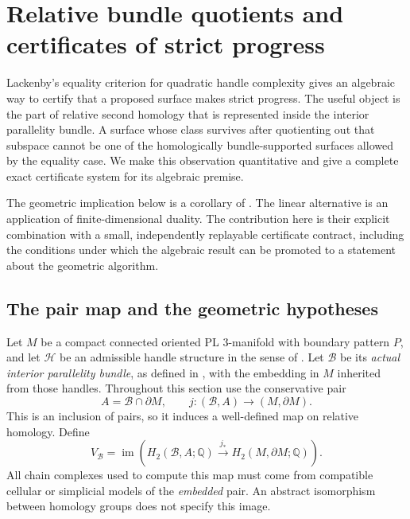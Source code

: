\section{Relative bundle quotients and certificates of strict progress}
\label{sec:quotient-progress}

Lackenby's equality criterion for quadratic handle complexity gives an
algebraic way to certify that a proposed surface makes strict progress.
The useful object is the part of relative second homology that is
represented inside the interior parallelity bundle. A surface whose class
survives after quotienting out that subspace cannot be one of the
homologically bundle-supported surfaces allowed by the equality case.
We make this observation quantitative and give a complete exact
certificate system for its algebraic premise.

The geometric implication below is a corollary of
\cite[Proposition~5.9]{lackenby2026}. The linear alternative is an
application of finite-dimensional duality. The contribution here is their
explicit combination with a small, independently replayable certificate
contract, including the conditions under which the algebraic result can
be promoted to a statement about the geometric algorithm.

\subsection{The pair map and the geometric hypotheses}

Let $M$ be a compact connected oriented PL $3$-manifold with boundary
pattern $P$, and let $\mathcal H$ be an admissible handle structure in the
sense of \cite[Definition~5.3]{lackenby2026}. Let $\mathcal B$ be its
\emph{actual interior parallelity bundle}, as defined in
\cite[Definition~5.6]{lackenby2026}, with the embedding in $M$ inherited
from those handles. Throughout this section use the conservative pair
\[
 A=\mathcal B\cap\partial M,\qquad
 j:(\mathcal B,A)\longrightarrow(M,\partial M).
\]
This is an inclusion of pairs, so it induces a well-defined map on
relative homology. Define
\begin{equation}
 \label{eq:quotient-bundle-image}
 V_{\mathcal B}
 =\operatorname{im}\!\left(
 H_2(\mathcal B,A;\mathbb Q)
 \xrightarrow{\,j_*\,} H_2(M,\partial M;\mathbb Q)
 \right).
\end{equation}
All chain complexes used to compute this map must come from compatible
cellular or simplicial models of the \emph{embedded} pair. An abstract
isomorphism between homology groups does not specify this image.

